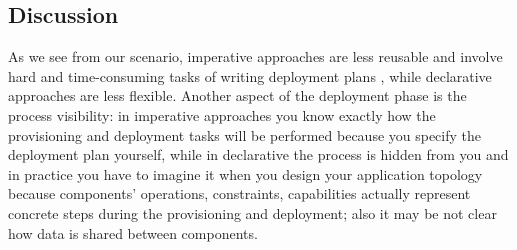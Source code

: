 
\subsection{Discussion}
\label{sec:Discussion}

\noindent As we see from our scenario, imperative approaches are less reusable and involve hard and time-consuming tasks of writing deployment plans \cite{Breitenbuecher2014}, while declarative approaches are less flexible. Another aspect of the deployment phase is the process visibility: in imperative approaches you know exactly how the provisioning and deployment tasks will be performed because you specify the deployment plan yourself, while in declarative the process is hidden from you and in practice you have to imagine it when you design your application topology because components' operations, constraints, capabilities actually represent concrete steps during the provisioning and deployment; also it may be not clear how data is shared between components. 

\noindent 

